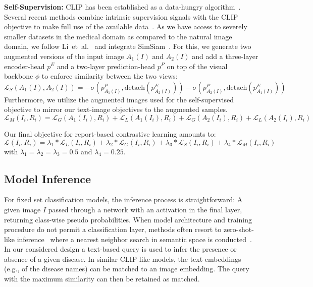 \documentclass[runningheads]{llncs}
\begin{document}
\noindent\textbf{Self-Supervision:} CLIP has been established as a data-hungry algorithm~\cite{radford2021learning,pham2021combined}. Several recent methods combine intrinsic supervision signals with the CLIP objective to make full use of the available data~\cite{li2021supervision,mu2021slip}. 
As we have access to severely smaller datasets in the medical domain as compared to the natural image domain, we follow Li~et~al.~\cite{li2021supervision} and integrate SimSiam~\cite{chen2021exploring}. For this, we generate two augmented versions of the input image $A_1(I)$ and $A_2(I)$ and add a three-layer encoder-head $p^{E}$ and a two-layer prediction-head $p^{P}$ on top of the visual backbone $\phi$ to enforce similarity between the two views:
\begin{equation}
    \mathcal{L}_{S}(A_1(I),A_2(I)) = - \sigma(p^{P}_{A_1(I)}, \text{detach}(p^{E}_{A_2(I)}))  - \sigma(p^{P}_{A_2(I)}, \text{detach}(p^{E}_{A_1(I)}))
\end{equation}
Furthermore, we utilize the augmented images used for the self-supervised objective to mirror our text-image objectives to the augmented samples. 
\begin{equation}
    \mathcal{L}_{M}(I_i,R_i) = \mathcal{L}_G(A_1(I_i), R_i) + \mathcal{L}_L(A_1(I_i), R_i) + \mathcal{L}_G(A_2(I_i), R_i) + \mathcal{L}_L(A_2(I_i), R_i)
\end{equation}

Our final objective for report-based contrastive learning amounts to: 
\begin{equation}
    \mathcal{L}(I_i,R_i) = 
    \lambda_1 * \mathcal{L}_{L}(I_i,R_i) +
    \lambda_2 * \mathcal{L}_{G}(I_i,R_i) +
    \lambda_3 * \mathcal{L}_{S}(I_i,R_i) +
    \lambda_4 * \mathcal{L}_{M}(I_i,R_i)
\end{equation}
with $\lambda_1 = \lambda_2 = \lambda_3 = 0.5$ and $\lambda_4 = 0.25$.

\subsection{Model Inference}
For fixed set classification models, the inference process is straightforward: A given image $I$ passed through a network with an activation in the final layer, returning class-wise pseudo probabilities. When model architecture and training procedure do not permit a classification layer, methods often resort to zero-shot-like inference~\cite{huang2021gloria,radford2021learning,wang2021self} where a nearest neighbor search in semantic space is conducted~\cite{frome2013devise}. 
In our considered design a text-based query is used to infer the presence or absence of a given disease. In similar CLIP-like models, the text embeddings (e.g., of the disease names) can be matched to an image embedding. The query with the maximum similarity can then be retained as matched.
\end{document}
